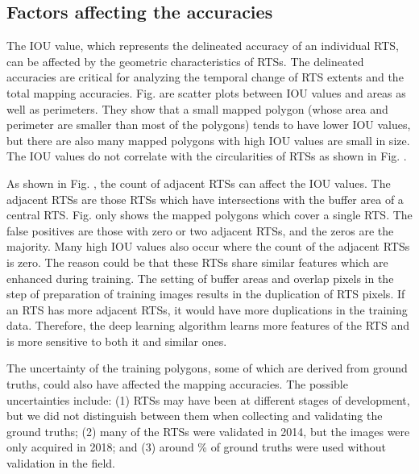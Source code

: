 \documentclass[authoryear,preprint,review,12pt]{elsarticle}
\begin{document}
\subsection{Factors affecting the accuracies}
\label{subsec_acc_factors}

The IOU value, which represents the delineated accuracy of an individual RTS, can be affected by the geometric characteristics of RTSs.
The delineated accuracies are critical for analyzing the temporal change of RTS extents and the total mapping accuracies.
Fig.  are scatter plots between IOU values and areas as well as perimeters. They show that a small mapped polygon (whose area and perimeter are smaller than most of the polygons) tends to have lower IOU values, but there are also many mapped polygons with high IOU values are small in size. 
The IOU values do not correlate with the circularities of RTSs as shown in Fig. . 


As shown in Fig. , the count of adjacent RTSs can affect the IOU values. The adjacent RTSs are those RTSs which have intersections with the buffer area of a central RTS. Fig.  only shows the mapped polygons which cover a single RTS. The false positives are those with zero or two adjacent RTSs, and the zeros are the majority. Many high IOU values also occur where the count of the adjacent RTSs is zero. The reason could be that these RTSs share similar features which are enhanced during training. The setting of buffer areas and overlap pixels in the step of preparation of training images results in the duplication of RTS pixels. If an RTS has more adjacent RTSs, it would have more duplications in the training data. Therefore, the deep learning algorithm learns more features of the RTS and is more sensitive to both it and similar ones. 

The uncertainty of the training polygons, some of which are derived from ground truths, could also have affected the mapping accuracies. The possible uncertainties include: (1) RTSs may have been at different stages of development, but we did not distinguish between them when collecting and validating the ground truths; (2) many of the RTSs were validated in 2014, but the images were only acquired in 2018; and (3) around \% of ground truths were used without validation in the field. 
\end{document}

